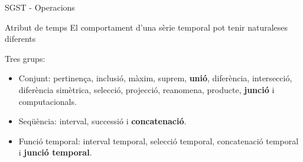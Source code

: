\begin{frame}{SGST - Operacions}

\begin{block}{Atribut de temps}
El comportament d’una sèrie temporal pot tenir naturaleses diferents
\end{block}



  Tres grups:
  \begin{itemize}
  \item Conjunt: pertinença, inclusió, màxim, suprem, \textbf{unió},
    diferència, intersecció, diferència simètrica, selecció,
    projecció, reanomena, producte, \textbf{junció} i computacionals.
  \item Seqüència: interval, successió i \textbf{concatenació}.
  \item Funció temporal: interval temporal, selecció temporal,
    concatenació temporal i \textbf{junció temporal}.
  \end{itemize}


\end{frame}


